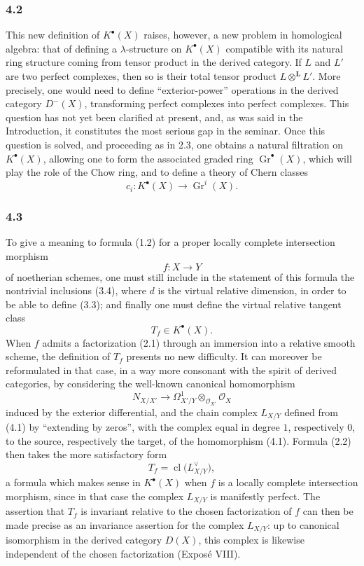 \documentclass[11pt]{article}
\newcommand{\Gr}{\operatorname{Gr}}
\newcommand{\cl}{\operatorname{cl}}
\providecommand{\Gr}{\operatorname{Gr}}
\providecommand{\Gr}{\operatorname{G}}
\begin{document}
\subsubsection*{4.2}
This new definition of $K^\bullet(X)$ raises, however, a new problem in homological algebra: that of defining a $\lambda$-structure on $K^\bullet(X)$ compatible with its natural ring structure coming from tensor product in the derived category. If $L$ and $L'$ are two perfect complexes, then so is their total tensor product $L\otimes^{\mathbf L}L'$. More precisely, one would need to define ``exterior-power'' operations in the derived category $D^-(X)$, transforming perfect complexes into perfect complexes. This question has not yet been clarified at present, and, as was said in the Introduction, it constitutes the most serious gap in the seminar. Once this question is solved, and proceeding as in 2.3, one obtains a natural filtration on $K^\bullet(X)$, allowing one to form the associated graded ring $\Gr^\bullet(X)$, which will play the role of the Chow ring, and to define a theory of Chern classes
\[
c_i:K^\bullet(X)\longrightarrow \Gr^i(X).
\]

\subsubsection*{4.3}
To give a meaning to formula (1.2) for a proper locally complete intersection morphism
\[
f:X\longrightarrow Y
\]
of noetherian schemes, one must still include in the statement of this formula the nontrivial inclusions (3.4), where $d$ is the virtual relative dimension, in order to be able to define (3.3); and finally one must define the virtual relative tangent class
\[
T_f\in K^\bullet(X).
\]
When $f$ admits a factorization (2.1) through an immersion into a relative smooth scheme, the definition of $T_f$ presents no new difficulty. It can moreover be reformulated in that case, in a way more consonant with the spirit of derived categories, by considering the well-known canonical homomorphism
\begin{equation}\tag{4.1}
N_{X/X'}\longrightarrow \Omega^1_{X'/Y}\otimes_{\mathcal O_{X'}}\mathcal O_X
\end{equation}
induced by the exterior differential, and the chain complex $L_{X/Y}$ defined from (4.1) by ``extending by zeros'', with the complex equal in degree $1$, respectively $0$, to the source, respectively the target, of the homomorphism (4.1). Formula (2.2) then takes the more satisfactory form
\begin{equation}\tag{4.2}
T_f=\cl\bigl(L_{X/Y}^{\vee}\bigr),
\end{equation}
a formula which makes sense in $K^\bullet(X)$ when $f$ is a locally complete intersection morphism, since in that case the complex $L_{X/Y}$ is manifestly perfect. The assertion that $T_f$ is invariant relative to the chosen factorization of $f$ can then be made precise as an invariance assertion for the complex $L_{X/Y}$: up to canonical isomorphism in the derived category $D(X)$, this complex is likewise independent of the chosen factorization (Expos\'e VIII).
\end{document}
